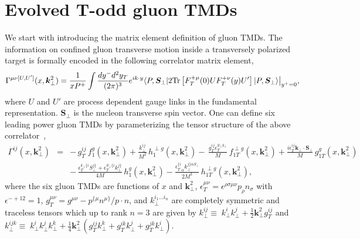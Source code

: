 \documentclass[prd,aps,preprintnumbers,fleqn,showpacs,nofootinbib,superscriptaddress]{revtex4}
\newcommand{\nn}{\nonumber}
\newcommand{\st}{{\scriptscriptstyle T}}
\def\nn{\nonumber}
\begin{document}
\section{Evolved T-odd gluon  TMDs}
We start with introducing the matrix element definition of gluon TMDs.  The information on confined gluon transverse motion inside a transversely polarized target is formally encoded in the following correlator matrix element,
\begin{eqnarray}
\Gamma^{\mu \nu [U,U']}(x,\bm{k}_{\perp}^2) = \frac{1}{xP^+}\int \frac{dy^-
d^2y_T}{(2\pi)^3} e^{ik \cdot y} \langle P, \bm{S}_\perp | 2 {\rm Tr} \left [
F_{T}^{+\mu}(0) U F_{T}^{+\nu}(y) U' \right ] |P, \bm{S}_\perp \rangle
\big|_{y^+=0} , \label{gmat}
\end{eqnarray}
where $U$ and $U'$ are process dependent gauge links in the
fundamental representation. $\bm{S}_\perp$ is the nucleon transverse spin vector. One can define six leading power gluon TMDs by
parameterizing the tensor structure of the above correlator~\cite{Mulders:2000sh, Boer:2016xqr},
\begin{eqnarray} \nn
   \Gamma^{ij}(x,\bm{k}_\perp^2) &=&   - \,g_\st^{ij} \,f_1^g(x,\bm{k}_\perp^2) + \frac{k_\perp^{ij}}{M^2} \,h_1^{\perp g}(x,\bm{k}_\perp^2)  - \,\frac{g_\st^{ij} \epsilon_\st^{S_\perp k_\perp}}{M} \,f_{1T}^{\perp g}(x,\bm{k}_\perp^2) + \frac{i \epsilon_\st^{ij} \bm{k}_\perp \cdot \bm{S}_\perp}{M} \,g_{1T}^g (x,\bm{k}_\perp^2) \\ &&
    - \,\frac{\epsilon_\st^{k_\perp\{i} S_\perp^{j\}} + \epsilon_\st^{S_\perp\{i} k_\perp^{j\}}}{4M} \,h_1^g(x,\bm{k}_\perp^2) - \frac{{\epsilon_\st^{\{i}}_\alpha k_\perp^{j\}\alpha S_\perp}}{2M^3} \,h_{1T}^{\perp g}(x,\bm{k}_\perp^2)  ,
 \label{gg_para}
\end{eqnarray}
where the six gluon TMDs are functions of $x$ and $\bm{k}_\perp^2$,
$\epsilon_T^{\mu \nu}=\epsilon^{\rho \sigma \mu \nu} p_\rho
n_\sigma$ with $\epsilon^{-+12} = 1$, $g_T^{\mu\nu}=g^{\mu\nu}-p^{ \{\mu} n^{\mu \} } /p \cdot n$, 
and $k_\perp^{i_1 \ldots i_n}$ are completely symmetric and traceless tensors which up to rank $n=3$ are given 
by $k_\perp^{ij} \equiv \;k_\perp^i k_\perp^j + \frac{1}{2} \bm{k}_\perp^2 g_\st^{ij} $ and $ k_\perp^{ijk} \equiv \;k_\perp^i k_\perp^j k_\perp^k + \frac{1}{4} \bm{k}_\perp^2 \left( g_\st^{ij} k_\perp^k + g_\st^{ik} k_\perp^j + g_\st^{jk} k_\perp^i \right) $. 
\end{document}
